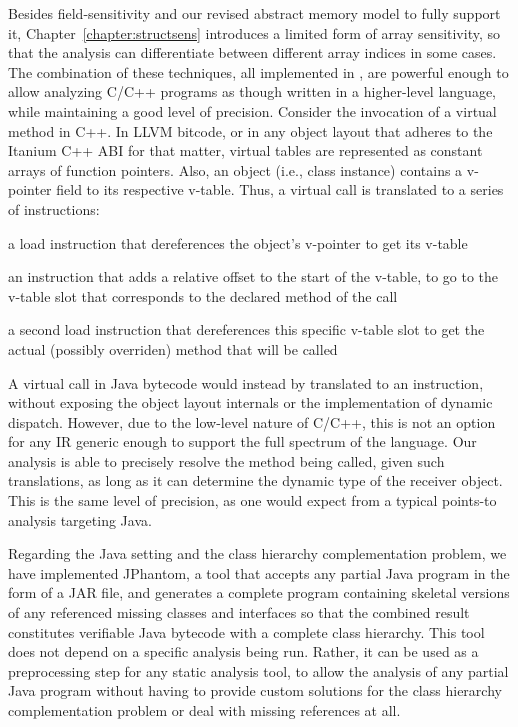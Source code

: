Besides field-sensitivity and our revised abstract memory model to
fully support it, Chapter~\ref{chapter:structsens} introduces a
limited form of array sensitivity, so that the analysis can
differentiate between different array indices in some cases. The
combination of these techniques, all implemented in \cclyzer{}, are
powerful enough to allow analyzing C/C++ programs as though written in
a higher-level language, while maintaining a good level of
precision. Consider the invocation of a virtual method in C++. In LLVM
bitcode, or in any object layout that adheres to the Itanium C++ ABI
\cite{itanium:cxx_abi} for that matter, virtual tables are represented
as constant arrays of function pointers. Also, an object (i.e., class
instance) contains a v-pointer field to its respective v-table. Thus,
a virtual call is translated to a series of instructions:
\begin{compactitem}[\(\cdot\)]
\item a load instruction that dereferences the object's v-pointer to
  get its v-table
\item an instruction that adds a relative offset to the start of the
  v-table, to go to the v-table slot that corresponds to the declared
  method of the call
\item a second load instruction that dereferences this specific
  v-table slot to get the actual (possibly overriden) method that will
  be called
\end{compactitem}

A virtual call in Java bytecode would instead by translated to an
 instruction, without exposing the object layout
internals or the implementation of dynamic dispatch. However, due to
the low-level nature of C/C++, this is not an option for any IR
generic enough to support the full spectrum of the language. Our
analysis is able to precisely resolve the method being called, given
such translations, as long as it can determine the dynamic type of the
receiver object. This is the same level of precision, as one would
expect from a typical points-to analysis targeting Java.

Regarding the Java setting and the class hierarchy complementation
problem, we have implemented JPhantom, a tool that accepts any partial
Java program in the form of a JAR file, and generates a complete
program containing skeletal versions of any referenced missing classes
and interfaces so that the combined result constitutes verifiable Java
bytecode with a complete class hierarchy. This tool does not depend on
a specific analysis being run. Rather, it can be used as a
preprocessing step for any static analysis tool, to allow the analysis
of any partial Java program without having to provide custom solutions
for the class hierarchy complementation problem or deal with missing
references at all.

